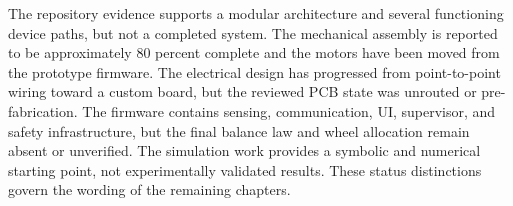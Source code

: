 The repository evidence supports a modular architecture and several
functioning device paths, but not a completed system. The mechanical
assembly is reported to be approximately 80 percent complete and the
motors have been moved from the prototype firmware. The electrical
design has progressed from point-to-point wiring toward a custom board,
but the reviewed PCB state was unrouted or pre-fabrication. The firmware
contains sensing, communication, UI, supervisor, and safety
infrastructure, but the final balance law and wheel allocation remain
absent or unverified. The simulation work provides a symbolic and
numerical starting point, not experimentally validated results. These
status distinctions govern the wording of the remaining chapters.
